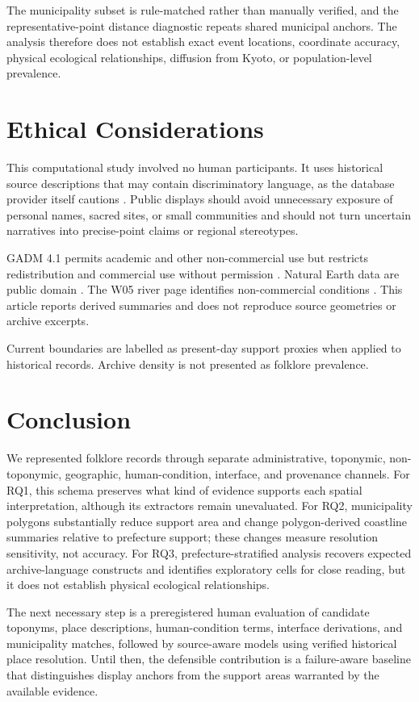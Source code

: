 \documentclass{isprs}
\begin{document}
The municipality subset is rule-matched rather than manually verified, and the representative-point distance diagnostic repeats shared municipal anchors. The analysis therefore does not establish exact event locations, coordinate accuracy, physical ecological relationships, diffusion from Kyoto, or population-level prevalence.

\section{Ethical Considerations}

This computational study involved no human participants. It uses historical source descriptions that may contain discriminatory language, as the database provider itself cautions \cite{nichibun2025}. Public displays should avoid unnecessary exposure of personal names, sacred sites, or small communities and should not turn uncertain narratives into precise-point claims or regional stereotypes.

GADM 4.1 permits academic and other non-commercial use but restricts redistribution and commercial use without permission \cite{gadm41}. Natural Earth data are public domain \cite{naturalearth}. The W05 river page identifies non-commercial conditions \cite{mlitw05}. This article reports derived summaries and does not reproduce source geometries or archive excerpts.

Current boundaries are labelled as present-day support proxies when applied to historical records. Archive density is not presented as folklore prevalence.


\section{Conclusion}

We represented \ArchiveRecords{} folklore records through separate administrative, toponymic, non-toponymic, geographic, human-condition, interface, and provenance channels. For RQ1, this schema preserves what kind of evidence supports each spatial interpretation, although its extractors remain unevaluated. For RQ2, municipality polygons substantially reduce support area and change polygon-derived coastline summaries relative to prefecture support; these changes measure resolution sensitivity, not accuracy. For RQ3, prefecture-stratified analysis recovers expected archive-language constructs and identifies exploratory cells for close reading, but it does not establish physical ecological relationships.

The next necessary step is a preregistered human evaluation of candidate toponyms, place descriptions, human-condition terms, interface derivations, and municipality matches, followed by source-aware models using verified historical place resolution. Until then, the defensible contribution is a failure-aware baseline that distinguishes display anchors from the support areas warranted by the available evidence.


\end{document}
